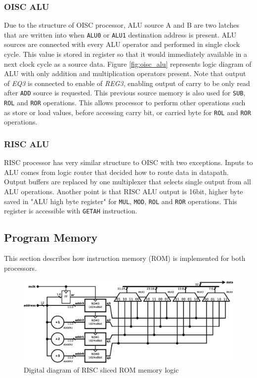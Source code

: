 \subsubsection{OISC ALU}
Due to the structure of OISC processor, ALU source A and B are two latches that are written into when \texttt{ALU0} or \texttt{ALU1} destination address is present. ALU sources are connected with every ALU operator and performed in single clock cycle. This value is stored in register so that it would immediately available in a next clock cycle as a source data. Figure \ref{fig:oisc_alu} represents logic diagram of ALU with only addition and multiplication operators present. Note that output of \textit{EQ3} is connected to enable of \textit{REG3}, enabling output of carry to be only read after \texttt{ADD} source is requested. This previous source memory is also used for \texttt{SUB}, \texttt{ROL} and \texttt{ROR} operations. This allows processor to perform other operations such as store or load values, before accessing carry bit, or carried byte for \texttt{ROL} and \texttt{ROR} operations.

\subsubsection{RISC ALU}
RISC processor has very similar structure to OISC with two exceptions. Inputs to ALU comes from logic router that decided how to route data in datapath. Output buffers are replaced by one multiplexer that selects single output from all ALU operations. Another point is that RISC ALU output is 16bit, higher byte saved in "ALU high byte register" for \texttt{MUL}, \texttt{MOD}, \texttt{ROL} and \texttt{ROR} operations. This register is accessible with \texttt{GETAH} instruction.

\subsection{Program Memory}\label{subsec:memory}
This section describes how instruction memory (ROM) is implemented for both processors.

\begin{figure}[b]
	\centering
	\includegraphics[width=\linewidth]{../resources/risc_mem.eps}
	\caption{Digital diagram of RISC sliced ROM memory logic}
	\label{fig:risc_mem}
\end{figure}

